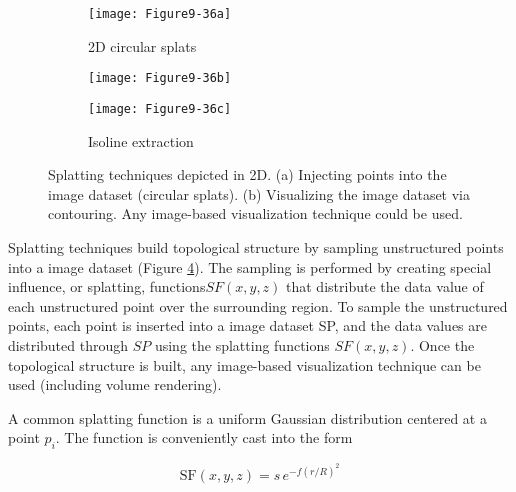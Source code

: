 \begin{description}[leftmargin=0cm,labelindent=0cm]

\item[Splatting Techniques.]
\label{subsec:visualizing_unstructured_points_splatting_techniques}

\begin{figure}[htb]
    \centering
	\begin{subfigure}[h]{0.36\linewidth}
		\texttt{[image: Figure9-36a]}
		\captionsetup{justification=centering}
		\caption{2D circular splats}
		\label{fig:Figure9-36a}
	\end{subfigure}
	\hfill
	\begin{subfigure}[h]{0.24\linewidth}
		\texttt{[image: Figure9-36b]}
		\captionsetup{justification=centering}
		\caption*{}
		\label{fig:Figure9-36b}
	\end{subfigure}
	\hfill
	\begin{subfigure}[h]{0.36\linewidth}
		\texttt{[image: Figure9-36c]}
		\captionsetup{justification=centering}
		\caption{Isoline extraction}
		\label{fig:Figure9-36c}
	\end{subfigure}
	\caption{Splatting techniques depicted in 2D. (a) Injecting points into the image dataset (circular splats). (b) Visualizing the image dataset via contouring. Any image-based visualization technique could be used.}\label{fig:Figure9-36}
\end{figure}


Splatting techniques build topological structure by sampling unstructured points into a image dataset (Figure \ref{fig:Figure9-36}). The sampling is performed by creating special influence, or splatting, functions$ SF(x,y,z)$ that distribute the data value of each unstructured point over the surrounding region. To sample the unstructured points, each point is inserted into a image dataset SP, and the data values are distributed through $SP$ using the splatting functions $SF(x,y,z)$. Once the topological structure is built, any image-based visualization technique can be used (including volume rendering).

A common splatting function is a uniform Gaussian distribution centered at a point $p_i$. The function is conveniently cast into the form

\begin{equation}\label{eq:9.22}
\text{SF}(x, y, z) = s\, e^{-f(r/R)^2}
\end{equation}


\end{description}
